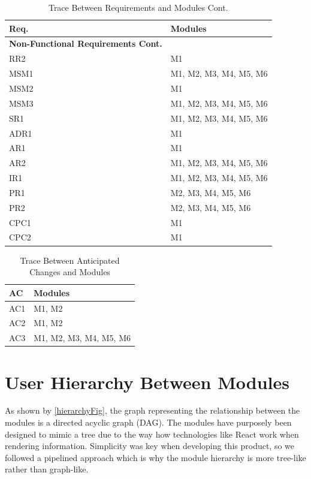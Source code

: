 \documentclass[12pt, titlepage]{article}
\begin{document}
\begin{table}[H]
    \centering
    \begin{tabular}{p{} p{}}
        \toprule
        \textbf{Req.} & \textbf{Modules}\\
        \midrule
        \textbf{Non-Functional Requirements Cont.}\\     
        RR2 & M1 \\
        MSM1 & M1, M2, M3, M4, M5, M6 \\
        MSM2 & M1 \\
        MSM3 & M1, M2, M3, M4, M5, M6 \\
        SR1 & M1, M2, M3, M4, M5, M6 \\
        ADR1 & M1 \\
        AR1 & M1 \\
        AR2 & M1, M2, M3, M4, M5, M6 \\
        IR1 & M1, M2, M3, M4, M5, M6 \\
        PR1 & M2, M3, M4, M5, M6 \\
        PR2 & M2, M3, M4, M5, M6 \\
        CPC1 & M1 \\
        CPC2 & M1 \\
        \bottomrule
    \end{tabular}
    \caption{Trace Between Requirements and Modules Cont.}
\end{table}

\begin{table}[H]
    \centering
    \begin{tabular}{p{} p{}}
        \toprule
        \textbf{AC} & \textbf{Modules}\\
        \midrule
            AC1 & M1, M2 \\
            AC2 & M1, M2 \\
            AC3 & M1, M2, M3, M4, M5, M6 \\
        \bottomrule
    \end{tabular}
    \caption{Trace Between Anticipated Changes and Modules}
\end{table}

\section{User Hierarchy Between Modules}
As shown by \ref{hierarchyFig}, the graph representing the relationship
between the modules is a directed acyclic graph (DAG). 
The modules have purposely been designed to mimic a tree due to the way
how technologies like React work when rendering information. Simplicity was 
key when developing this product, so we followed a pipelined approach which is why
the module hierarchy is more tree-like rather than graph-like.
 
\end{document}
